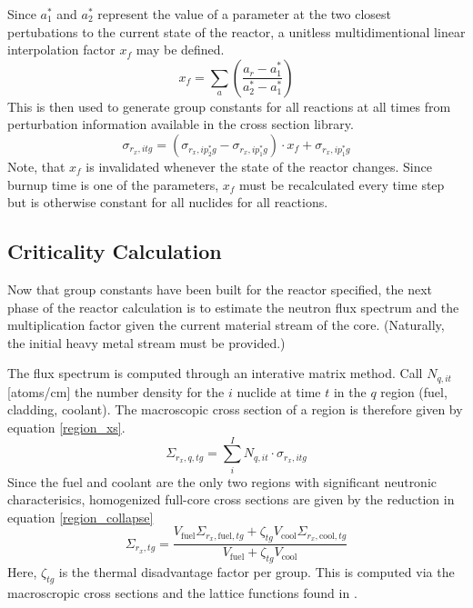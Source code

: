 Since $a_1^*$ and $a_2^*$ represent the value of a parameter at the two closest pertubations to the
current state of the reactor, a unitless multidimentional linear interpolation factor $x_f$ may be defined.
\begin{equation}
\label{x_factor}
x_f = \sum_a \left(\frac{a_r - a_1^*}{a_2^* - a_1^*}\right)
\end{equation}
This is then used to generate group constants for all reactions at all times from perturbation information
available in the cross section library. 
\begin{equation}
\label{sig_multi_interp}
\sigma_{r_x,itg} = (\sigma_{r_x,ip_2^*g} - \sigma_{r_x,ip_1^*g}) \cdot x_f  + \sigma_{r_x,ip_1^*g}
\end{equation}
Note, that $x_f$ is invalidated whenever the state of the reactor changes.  Since burnup time is one of 
the parameters, $x_f$ must be recalculated every time step but is otherwise constant for all nuclides
for all reactions.


\subsection{Criticality Calculation}
\label{mg_sec:crit_calc}
Now that group constants have been built for the reactor specified, the next phase of the reactor 
calculation is to estimate the neutron flux spectrum and the multiplication factor given the current 
material stream of the core. (Naturally, the initial heavy metal stream must be provided.)

The flux spectrum is computed through an interative matrix method.  Call $N_{q,it}$ [atoms/cm] 
the number density for the $i$ nuclide at time $t$ in the $q$ region 
(fuel, cladding, coolant).  The macroscopic cross section of a region is therefore given by equation 
\ref{region_xs}.
\begin{equation}
\label{region_xs}
\Sigma_{r_x,q,tg} = \sum_i^I N_{q,it} \cdot \sigma_{r_x,itg}
\end{equation}
Since the fuel and coolant are the only two regions with significant neutronic characterisics, 
homogenized full-core cross sections are given by the reduction in equation \ref{region_collapse}
\begin{equation}
\label{region_collapse}
\Sigma_{r_x,tg} = \frac{V_{\mbox{fuel}}\Sigma_{r_x,\mbox{fuel},tg} + \zeta_{tg}V_{\mbox{cool}}\Sigma_{r_x,\mbox{cool},tg}}
                       {V_{\mbox{fuel}} + \zeta_{tg}V_{\mbox{cool}}}
\end{equation}
Here, $\zeta_{tg}$ is the thermal disadvantage factor per group.  This is computed via the macroscropic 
cross sections and the lattice functions found in \cite{Lamarsh2002}.

